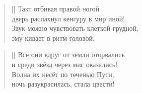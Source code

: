 \documentclass[a5paper,11pt]{memoir}
\begin{document}
\BgThispage



\begin{verse}[\versewidth]
Такт отбивая правой ногой\\
дверь распахнул кенгуру в мир иной!\\
Звук можно чувствовать клеткой грудной,\\
эм\'{у} кивает в ритм головой.
\end{verse}

\begin{verse}[\versewidth]
Все они вдруг от земли оторвались\\
и среди звёзд через миг оказались!\\
Волна их несёт по теченью Пути,\\
ночь разукрасилась, стала цвести!
\end{verse}
\end{document}
